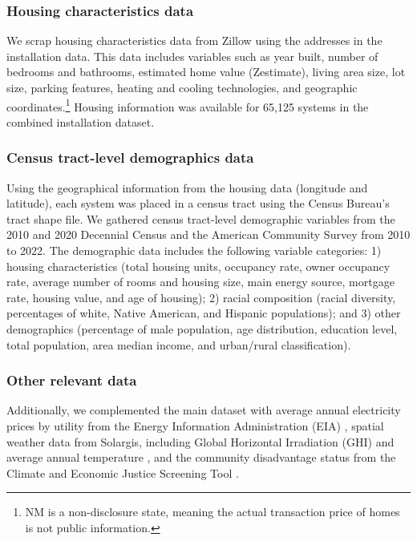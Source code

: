\documentclass[12pt,twoside,letterpaper]{article}
\begin{document}
\subsubsection{Housing characteristics data}

We scrap housing characteristics data from Zillow using the addresses in the installation data. This data includes variables such as year built, number of bedrooms and bathrooms, estimated home value (Zestimate), living area size, lot size, parking features, heating and cooling technologies, and geographic coordinates.\footnote{NM is a non-disclosure state, meaning the actual transaction price of homes is not public information.} Housing information was available for 65,125 systems in the combined installation dataset.

\subsubsection{Census tract-level demographics data}

Using the geographical information from the housing data (longitude and latitude), each system was placed in a census tract using the Census Bureau’s tract shape file. We gathered census tract-level demographic variables from the 2010 and 2020 Decennial Census and the American Community Survey from 2010 to 2022. The demographic data includes the following variable categories: 1) housing characteristics (total housing units, occupancy rate, owner occupancy rate, average number of rooms and housing size, main energy source, mortgage rate, housing value, and age of housing); 2) racial composition (racial diversity, percentages of white, Native American, and Hispanic populations); and 3) other demographics (percentage of male population, age distribution, education level, total population, area median income, and urban/rural classification).

\subsubsection{Other relevant data}

Additionally, we complemented the main dataset with average annual electricity prices by utility from the Energy Information Administration (EIA) \parencite{eiaprice}, spatial weather data from Solargis, including Global Horizontal Irradiation (GHI) and average annual temperature \parencite{solargis}, and the community disadvantage status from the Climate and Economic Justice Screening
Tool \parencite{cejst}.
\end{document}
